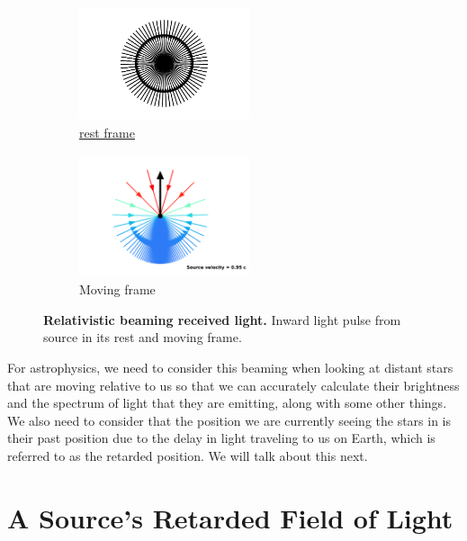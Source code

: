 \begin{figure}[H]
	\begin{subfigure}{.49\textwidth}
		\centering
		\includegraphics[width = 5cm]{images/pdf/Rest_velocities_inwards.pdf}
		\caption{\hyperlink{def-proper-frame}{rest frame}}
	\end{subfigure}
	\begin{subfigure}{.49\textwidth}
		\centering
		\includegraphics[width = 5cm]{images/pdf/Aberrated_velocities_inwards.pdf}
		\caption{Moving frame}
	\end{subfigure}
	\caption{\textbf{Relativistic beaming received light.} Inward light pulse from source in its rest and moving frame.}
	\label{fig: Relativistic Beaming Recieved}
\end{figure}

%

For astrophysics, we need to consider this beaming when looking at distant stars that are moving relative to us so that we can accurately calculate their brightness and the spectrum of light that they are emitting, along with some other things.
We also need to consider that the position we are currently seeing the stars in is their past position due to the delay in light traveling to us on Earth, which is referred to as the retarded position.
We will talk about this next.

\section{A Source's Retarded Field of Light} \label{sect: Retarded Field}

